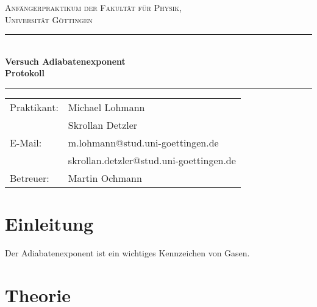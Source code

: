\documentclass[12pt,a4paper,titlepage,headinclude,bibtotoc]{scrartcl}
\begin{document}
\begin{titlepage}
\centering
\textsc{\Large Anfängerpraktikum der Fakultät für
  Physik,\\[1.5ex] Universität Göttingen}

\vspace*{4.2cm}

\rule{\textwidth}{1pt}\\[0.5cm]
{\huge \bfseries
  Versuch Adiabatenexponent\\[1.5ex]
  Protokoll}\\[0.5cm]
\rule{\textwidth}{1pt}

\vspace*{3cm}

\begin{Large}
\begin{tabular}{ll}
Praktikant: &  Michael Lohmann\\
& Skrollan Detzler\\
E-Mail: & m.lohmann@stud.uni-goettingen.de\\
 & skrollan.detzler@stud.uni-goettingen.de\\
Betreuer: & Martin Ochmann\\
\end{tabular}
\end{Large}

\vspace*{0.8cm}

\begin{Large}
\end{Large}

\end{titlepage}

\tableofcontents

\newpage

\section{Einleitung}
\label{sec:einleitung}
Der Adiabatenexponent ist ein wichtiges Kennzeichen von Gasen.

\section{Theorie}
\label{sec:theorie}
                                                                                                                                                                      
\end{document}
